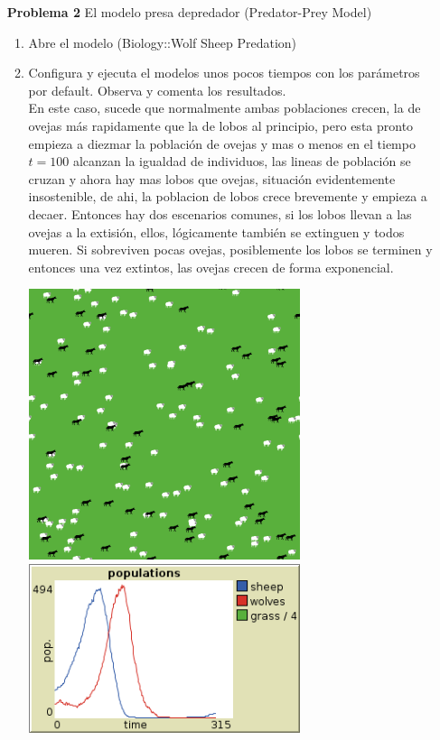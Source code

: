 \documentclass{article}
\begin{document}
\begin{enumerate}
\item[\bf{Problema 2}] El modelo presa depredador (Predator-Prey Model)
\begin{enumerate}
\item Abre el modelo (Biology::Wolf Sheep Predation)
\item Configura y ejecuta el modelos unos pocos tiempos con los parámetros por default. Observa y comenta los resultados.\\

En este caso, sucede que normalmente ambas poblaciones crecen, la de ovejas más rapidamente que la de lobos al principio, pero esta pronto empieza a diezmar la población de ovejas y mas o menos en el tiempo $t=100$ alcanzan la igualdad de individuos, las lineas de población se cruzan y ahora hay mas lobos que ovejas, situación evidentemente insostenible, de ahi, la poblacion de lobos crece brevemente y empieza a decaer. Entonces hay dos escenarios comunes, si los lobos llevan a las ovejas a la extisión, ellos, lógicamente también se extinguen y todos mueren. Si sobreviven pocas ovejas, posiblemente los lobos se terminen y entonces una vez extintos, las ovejas crecen de forma exponencial.

\includegraphics[width=300px]{Wolf1.png}\\
\includegraphics[width=300px]{Wolf2.png}\\



\end{enumerate}
\end{enumerate}
\end{document}
